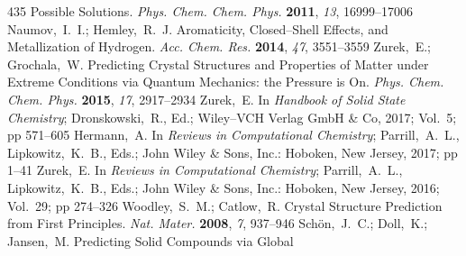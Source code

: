 \documentclass[12pt,letterpaper,oneside]{article}
\begin{document}
\begin{mcitethebibliography}{435}
  Possible Solutions. \emph{Phys. Chem. Chem. Phys.} \textbf{2011}, \emph{13},
  16999--17006\relax
\mciteBstWouldAddEndPuncttrue
\mciteSetBstMidEndSepPunct{\mcitedefaultmidpunct}
{\mcitedefaultendpunct}{\mcitedefaultseppunct}\relax
\EndOfBibitem
{}
Naumov,~I.~I.; Hemley,~R.~J. Aromaticity, Closed--Shell Effects, and
  Metallization of Hydrogen. \emph{Acc. Chem. Res.} \textbf{2014}, \emph{47},
  3551--3559\relax
\mciteBstWouldAddEndPuncttrue
\mciteSetBstMidEndSepPunct{\mcitedefaultmidpunct}
{\mcitedefaultendpunct}{\mcitedefaultseppunct}\relax
\EndOfBibitem
{}
Zurek,~E.; Grochala,~W. Predicting Crystal Structures and Properties of Matter
  under Extreme Conditions via Quantum Mechanics: the Pressure is On.
  \emph{Phys. Chem. Chem. Phys.} \textbf{2015}, \emph{17}, 2917--2934\relax
\mciteBstWouldAddEndPuncttrue
\mciteSetBstMidEndSepPunct{\mcitedefaultmidpunct}
{\mcitedefaultendpunct}{\mcitedefaultseppunct}\relax
\EndOfBibitem
{}
Zurek,~E. In \emph{Handbook of Solid State Chemistry}; Dronskowski,~R., Ed.;
  Wiley--VCH Verlag GmbH \& Co, 2017; Vol.~5; pp 571--605\relax
\mciteBstWouldAddEndPuncttrue
\mciteSetBstMidEndSepPunct{\mcitedefaultmidpunct}
{\mcitedefaultendpunct}{\mcitedefaultseppunct}\relax
\EndOfBibitem
{}
Hermann,~A. In \emph{Reviews in Computational Chemistry}; Parrill,~A.~L.,
  Lipkowitz,~K.~B., Eds.; John Wiley \& Sons, Inc.: Hoboken, New Jersey, 2017;
  pp 1--41\relax
\mciteBstWouldAddEndPuncttrue
\mciteSetBstMidEndSepPunct{\mcitedefaultmidpunct}
{\mcitedefaultendpunct}{\mcitedefaultseppunct}\relax
\EndOfBibitem
{}
Zurek,~E. In \emph{Reviews in Computational Chemistry}; Parrill,~A.~L.,
  Lipkowitz,~K.~B., Eds.; John Wiley \& Sons, Inc.: Hoboken, New Jersey, 2016;
  Vol.~29; pp 274--326\relax
\mciteBstWouldAddEndPuncttrue
\mciteSetBstMidEndSepPunct{\mcitedefaultmidpunct}
{\mcitedefaultendpunct}{\mcitedefaultseppunct}\relax
\EndOfBibitem
{}
Woodley,~S.~M.; Catlow,~R. Crystal Structure Prediction from First Principles.
  \emph{Nat. Mater.} \textbf{2008}, \emph{7}, 937--946\relax
\mciteBstWouldAddEndPuncttrue
\mciteSetBstMidEndSepPunct{\mcitedefaultmidpunct}
{\mcitedefaultendpunct}{\mcitedefaultseppunct}\relax
\EndOfBibitem
{}
Sch\"on,~J.~C.; Doll,~K.; Jansen,~M. Predicting Solid Compounds via Global

\end{mcitethebibliography}
\end{document}
